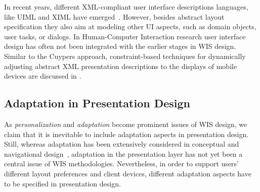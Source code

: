 \documentclass[oribibl]{llncs}
\begin{document}
In recent years, different XML-compliant user interface descriptions languages, like UIML and XIML have emerged~\cite{souchon2003}.
However, besides abstract layout specification they also aim at modeling other UI aspects, such as domain objects, user tasks, or dialogs.
In Human-Computer Interaction research user interface design has often not
been integrated with the earlier stages in WIS design.
Similar to the Cuypers approach, constraint-based techniques for dynamically adjusting abstract XML presentation descriptions to the displays of mobile devices are discussed in \cite{eisenstein2001}.

\subsection{Adaptation in Presentation Design}
As \emph{personalization} and \emph{adaptation} become prominent issues of WIS design, we claim that it is inevitable to include adaptation aspects in presentation design. 
Still, whereas adaptation has been extensively considered in conceptual and navigational design~\cite{hera:itcc,ceri:webml}, 
adaptation in the presentation layer has not yet been a central issue of WIS methodologies.
Nevertheless, in order to support users' different layout preferences and 
client devices,
different adaptation aspects have to be specified in presentation design.
\end{document}
